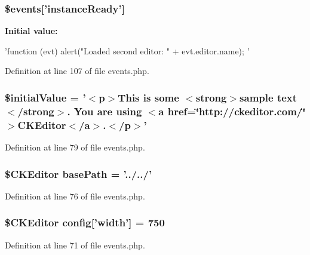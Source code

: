 \hypertarget{events_8php_a39ea8a713233b952d0bc0e6b1679fd46}{
\subsubsection[{\$events}]{\setlength{\rightskip}{0pt plus 5cm}\$events\mbox{[}'instanceReady'\mbox{]}}}
\label{events_8php_a39ea8a713233b952d0bc0e6b1679fd46}
{\bfseries Initial value:}
\begin{DoxyCode}
 'function (evt) {
    alert("Loaded second editor: " + evt.editor.name);
}'
\end{DoxyCode}


Definition at line 107 of file events.php.

\hypertarget{events_8php_ab352e6e5b00f0a2533b1b64b8306e95f}{
\subsubsection[{\$initialValue}]{\setlength{\rightskip}{0pt plus 5cm}\$initialValue = '$<$p$>$This is some $<$strong$>$sample text$<$/strong$>$. You are using $<$a href=\char`\"{}http://ckeditor.com/\char`\"{}$>$CKEditor$<$/a$>$.$<$/p$>$'}}
\label{events_8php_ab352e6e5b00f0a2533b1b64b8306e95f}


Definition at line 79 of file events.php.

\hypertarget{events_8php_a94a267f018012b013582daafb6a89618}{
\subsubsection[{basePath}]{\setlength{\rightskip}{0pt plus 5cm}\${\bf CKEditor} {\bf basePath} = '../../'}}
\label{events_8php_a94a267f018012b013582daafb6a89618}


Definition at line 76 of file events.php.

\hypertarget{events_8php_a3f176ffce3afa63656bfc989470e3e24}{
\subsubsection[{config}]{\setlength{\rightskip}{0pt plus 5cm}\${\bf CKEditor} {\bf config}\mbox{[}'width'\mbox{]} = 750}}
\label{events_8php_a3f176ffce3afa63656bfc989470e3e24}


Definition at line 71 of file events.php.

